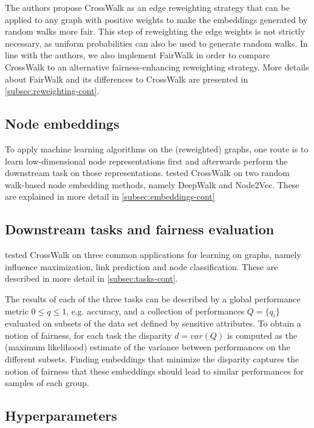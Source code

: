 The authors propose CrossWalk as an edge reweighting strategy that can be applied to any graph with positive weights to make the embeddings generated by random walks more fair. This step of reweighting the edge weights is not strictly necessary, as uniform probabilities can also be used to generate random walks. In line with the authors, we also implement FairWalk in order to compare CrossWalk to an alternative fairness-enhancing reweighting strategy. More details about FairWalk and its differences to CrossWalk are presented in \autoref{subsec:reweighting-cont}.


\subsection{Node embeddings}

To apply machine learning algorithms on the (reweighted) graphs, one route is to learn low-dimensional node representations first and afterwards perform the downstream task on those representations. \citet{Khajehnejad2022} tested CrossWalk on two random walk-based node embedding methods, namely DeepWalk and Node2Vec. These are explained in more detail in \autoref{subsec:embeddings-cont}


\subsection{Downstream tasks and fairness evaluation}
\citet{Khajehnejad2022} tested CrossWalk on three common applications for learning on graphs, namely influence maximization, link prediction and node classification. These are described in more detail in \autoref{subsec:tasks-cont}. 

The results of each of the three tasks can be described by a global performance metric $0 \leq q \leq 1$, e.g. accuracy, and a collection of performances $Q=\{q_i\}$ evaluated on subsets of the data set defined by sensitive attributes.
To obtain a notion of fairness, for each task the disparity $d=var(Q)$ is computed as the (maximum likelihood) estimate of the variance between performances on the different subsets.
Finding embeddings that minimize the disparity captures the notion of fairness that these embeddings should lead to similar performances for samples of each group.


\subsection{Hyperparameters}
\label{subsec:hyperparameters}

